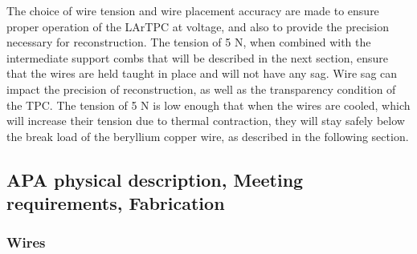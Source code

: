 The choice of wire tension and wire placement accuracy are made to ensure proper operation of the LArTPC at voltage, and also to provide the precision necessary for reconstruction.  The tension of 5 N, when combined with the intermediate support combs that will be described in the next section, ensure that the wires are held taught in place and will not have any sag.  Wire sag can impact the precision of reconstruction, as well as the transparency condition of the TPC.  The tension of 5 N is low enough that when the wires are cooled, which will increase their tension due to thermal contraction, they will stay safely below the break load of the beryllium copper wire, as described in the following section.







\subsection{APA physical description, Meeting requirements, Fabrication}
\subsubsection{Wires}


